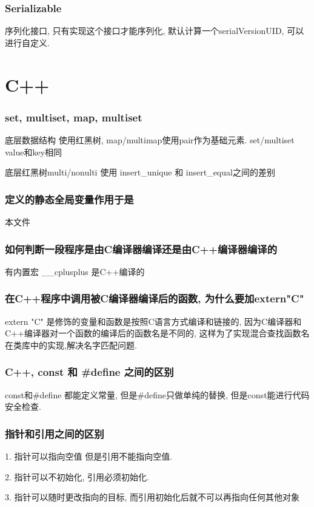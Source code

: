 \documentclass[UTF8]{ctexart}
\begin{document}
\subsubsection{Serializable}
序列化接口, 只有实现这个接口才能序列化, 默认计算一个serialVersionUID, 可以进行自定义.
\section{C++}
\subsubsection{set, multiset, map, multiset}
底层数据结构 使用红黑树, map/multimap使用pair作为基础元素. set/multiset value和key相同 \par
底层红黑树multi/nonulti 使用 insert\_unique 和 insert\_equal之间的差别 \par
\subsubsection{定义的静态全局变量作用于是}
本文件
\subsubsection{如何判断一段程序是由C编译器编译还是由C++编译器编译的}
有内置宏 \_\_cplusplus 是C++编译的
\subsubsection{在C++程序中调用被C编译器编译后的函数, 为什么要加extern"C"}
extern "C" 是修饰的变量和函数是按照C语言方式编译和链接的, 因为C编译器和C++编译器对一个函数的编译后的函数名是不同的, 这样为了实现混合查找函数名在类库中的实现,解决名字匹配问题. \par
\subsubsection{C++, const 和 \#define 之间的区别}
const和\#define 都能定义常量, 但是\#define只做单纯的替换, 但是const能进行代码安全检查. 
\subsubsection{指针和引用之间的区别}
1. 指针可以指向空值 但是引用不能指向空值. \par
2. 指针可以不初始化, 引用必须初始化. \par
3. 指针可以随时更改指向的目标, 而引用初始化后就不可以再指向任何其他对象 \par
\end{document}
